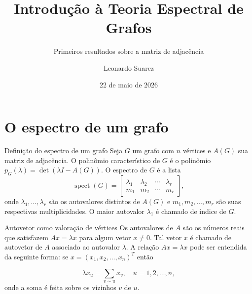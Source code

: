 \documentclass{beamer}
\title{Introdução à Teoria Espectral de Grafos}
\subtitle{Primeiros resultados sobre a matriz de adjacência}
\date{22 de maio de 2026}
\author{Leonardo Suarez}
\institute{Instituto de Matemática e Estatística - UFRGS}
\DeclareMathOperator{\spect}{spect}
\begin{document}
\nocite{notas_col,cvetkovic}

\frame{\titlepage}

\begin{frame}
    \tableofcontents
\end{frame}

\section{O espectro de um grafo}

\begin{frame}{Definição do espectro de um grafo}
    Seja \(G\) um grafo com \(n\) vértices e \(A(G)\) sua matriz de adjacência. O \alert{polinômio característico} de \(G\) é o polinômio \(p_G(\lambda) = \det(\lambda I - A(G))\). O \alert{espectro} de \(G\) é a lista 
    \[\spect(G) = \begin{bmatrix}
        \lambda_1 & \lambda_2 & \cdots & \lambda_r \\
        m_1 & m_2 & \cdots & m_r
        \end{bmatrix},
    \] onde \(\lambda_1, \ldots, \lambda_r\) são os autovalores distintos de \(A(G)\) e \(m_1, m_2, \ldots, m_r\) são suas respectivas multiplicidades. O maior autovalor \(\lambda_1\) é chamado de \alert{índice} de \(G\).
    
\end{frame}

\begin{frame}{Autovetor como valoração de vértices}
    Os \alert{autovalores} de \(A\) são os números reais que satisfazem \(Ax = \lambda x\) para algum vetor \(x \neq 0\). Tal vetor \(x\) é chamado de \alert{autovetor} de \(A\) associado ao autovalor \(\lambda\). A relação \(Ax = \lambda x\) pode ser entendida da seguinte forma: se \(x = (x_1, x_2, \ldots, x_n)^T\) então

    \begin{equation}
        \lambda x_u = \sum_{v \sim u} x_v, \quad u = 1, 2, \ldots, n,
    \end{equation} onde a soma é feita sobre os vizinhos \(v\) de \(u\).
\end{frame}
\end{document}
